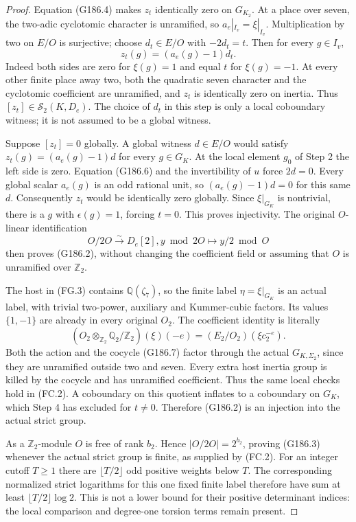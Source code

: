 \begin{proof}
Equation (G186.4) makes $z_t$ identically zero on $G_{K_2}$.
At a place over seven, the two-adic cyclotomic character is
unramified, so $a_e|_{I_v}=\xi|_{I_v}$.
Multiplication by two on $E/O$ is surjective; choose
$d_t\in E/O$ with $-2d_t=t$.
Then for every $g\in I_v$,
\[
                       z_t(g)=(a_e(g)-1)d_t.
 \tag{G186.8}
\]
Indeed both sides are zero for $\xi(g)=1$ and equal $t$
for $\xi(g)=-1$.
At every other finite place away two, both the quadratic
seven character and the cyclotomic coefficient are unramified,
and $z_t$ is identically zero on inertia.
Thus $[z_t]\in\mathcal S_2(K,D_e)$.
The choice of $d_t$ in this step is only a local coboundary
witness; it is not assumed to be a global witness.

Suppose $[z_t]=0$ globally.  A global witness $d\in E/O$ would
satisfy $z_t(g)=(a_e(g)-1)d$ for every $g\in G_K$.
At the local element $g_0$ of Step 2 the left side is zero.
Equation (G186.6) and the invertibility of $u$ force $2d=0$.
Every global scalar $a_e(g)$ is an odd rational unit, so
$(a_e(g)-1)d=0$ for this same $d$.
Consequently $z_t$ would be identically zero globally.
Since $\xi|_{G_K}$ is nontrivial, there is a $g$ with
$\epsilon(g)=1$, forcing $t=0$.
This proves injectivity.
The original $O$-linear identification
\[
             O/2O\xrightarrow{\sim}D_e[2],
                         y\bmod2O\longmapsto y/2\bmod O
 \tag{G186.9}
\]
then proves (G186.2), without changing the coefficient field
or assuming that $O$ is unramified over $\mathbb Z_2$.

The host in (FG.3) contains $\mathbb Q(\zeta_7)$, so the finite
label $\eta=\xi|_{G_K}$ is an actual label, with trivial
two-power, auxiliary and Kummer-cubic factors.
Its values $\{1,-1\}$ are already in every original $O_2$.
The coefficient identity is literally
\[
 (O_2\otimes_{\mathbb Z_2}\mathbb Q_2/\mathbb Z_2)(\xi)(-e)
                         =(E_2/O_2)(\xi c_2^{-e}).
 \tag{G186.10}
\]
Both the action and the cocycle (G186.7) factor through the
actual $G_{K,\Sigma_2}$, since they are unramified outside
two and seven.  Every extra host inertia group is killed
by the cocycle and has unramified coefficient.
Thus the same local checks hold in (FC.2).
A coboundary on this quotient inflates to a coboundary on
$G_K$, which Step 4 has excluded for $t\ne0$.
Therefore (G186.2) is an injection into the actual strict group.

As a $\mathbb Z_2$-module $O$ is free of rank $b_2$.
Hence $|O/2O|=2^{b_2}$, proving (G186.3) whenever the actual
strict group is finite, as supplied by (FC.2).
For an integer cutoff $T\geq1$ there are $\lfloor T/2\rfloor$
odd positive weights below $T$.  The corresponding normalized
strict logarithms for this one fixed finite label therefore have
sum at least $\lfloor T/2\rfloor\log2$.
This is not a lower bound for their positive determinant indices:
the local comparison and degree-one torsion terms remain present.
\end{proof}

